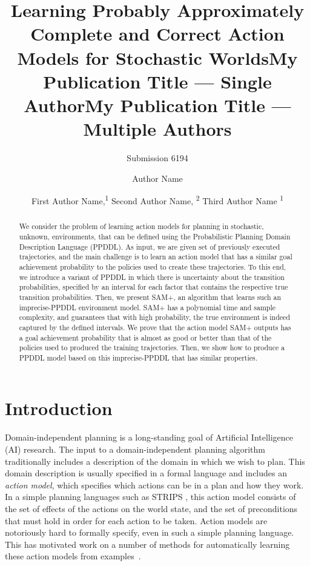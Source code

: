 \documentclass[letterpaper]{article} %
\title{Learning Probably  Approximately Complete and Correct Action Models for Stochastic Worlds}
\author{Submission 6194}
\title{My Publication Title --- Single Author}
\author {
    Author Name
}
\title{My Publication Title --- Multiple Authors}
\author {
    First Author Name,\textsuperscript{\rm 1}
    Second Author Name, \textsuperscript{\rm 2}
    Third Author Name \textsuperscript{\rm 1}
}
\begin{document}
\maketitle

\begin{abstract}
We consider the problem of learning action models for planning 
in stochastic, unknown, environments, that can be defined using the Probabilistic Planning Domain Description Language (PPDDL). 
As input, we are given set of previously executed trajectories, and the main challenge is to learn an action model that has a similar goal achievement probability to the policies used to create these trajectories. 
To this end, we introduce a variant of PPDDL in which there is uncertainty about the transition probabilities, specified by an interval for each factor that contains the respective true transition probabilities. 
Then, we present SAM+, an algorithm that learns such an imprecise-PPDDL environment model. 
SAM+ has a polynomial time and sample complexity, and guarantees that with high probability, the true environment is indeed captured by the defined intervals. 
We prove that the action model SAM+ outputs has a goal achievement probability that is almost as good or better than that of the policies used to produced the training trajectories.   
Then, we show how to produce a PPDDL model based on this imprecise-PPDDL that has similar properties. 
\end{abstract}

\section{Introduction}

Domain-independent planning is a long-standing goal of Artificial Intelligence (AI) research. 
The input to a domain-independent planning algorithm traditionally includes a description of the domain in which we wish to plan.
This domain description is usually specified in a formal language and includes an \emph{action model}, which specifies which actions can be in a plan and how they work. 
In a simple planning languages such as STRIPS \cite{fikes1971strips}, this action model consists of the set of effects of the actions on the world state, and the set of preconditions that must hold in order for each action to be taken. 
Action models are notoriously hard to formally specify, even in such a simple planning language. 
This has motivated work on a number of methods for automatically learning these action models from examples~\cite{yang2007learning,cresswell2011generalised,cresswell2013acquiring,zhuo2013action,stern2017efficientAndSafe,aineto19,juba2021kr}. 
\end{document}

